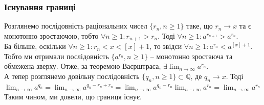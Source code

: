\documentclass[a4paper, 14pt]{article}
\theoremstyle{theoremdd}
\theoremstyle{theoremdd}
\theoremstyle{theoremdd}
\theoremstyle{theoremdd}
\theoremstyle{theoremdd}
\theoremstyle{theoremdd}
\theoremstyle{theoremdd}
\theoremstyle{theoremdd}
\begin{document}
\subsubsection*{Існування границі}

Розглянемо послідовність раціональних чисел $\{r_n, n \geq 1\}$ таке, що $r_n \to x$ та є монотонно зростаючою, тобто $\forall n \geq 1: r_{n+1} > r_n$.
Тоді $\forall n \geq 1: a^{r_{n+1}} > a^{r_n}$.\\
Ба більше, оскільки $\forall n \geq 1: r_n < x < [x]+1$, то звідси $\forall n \geq 1: a^{r_n} < a^{[x]+1}$.\\
Тобто ми отримали послідовність $\{a^{r_n}, n \geq 1\}$ -- монотонно зростаюча та обмежена зверху. Отже, за теоремою Ваєрштраса, $\exists \displaystyle\lim_{n \to \infty} a^{r_n}$.
\bigskip \\
А тепер розглянемо довільну послідовність $\{q_n, n \geq 1\} \subset \mathbb{Q}$, де $q_n \to x$. Тоді \\ $\displaystyle\lim_{n \to \infty} a^{q_n} = \displaystyle\lim_{n \to \infty} a^{q_n-r_n+r_n} = \displaystyle\lim_{n \to \infty} a^{q_n-r_n} \displaystyle\lim_{n \to \infty} a^{r_n} = \lim_{n \to \infty} a^{r_n}$\\
Таким чином, ми довели, що границя існує.
\end{document}

